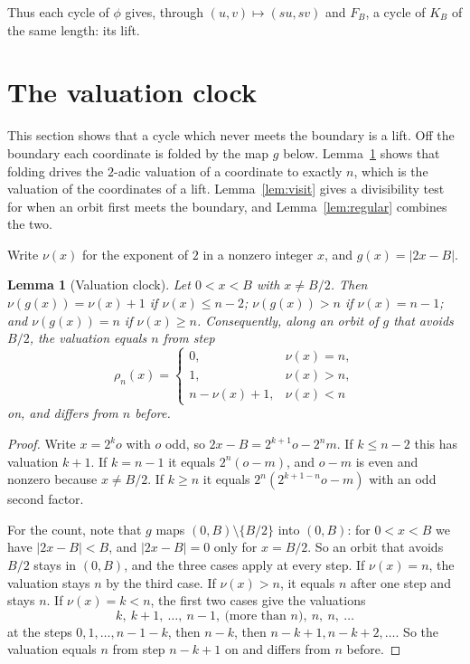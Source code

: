 \documentclass[11pt]{amsart}
\newtheorem{lemma}[theorem]{Lemma}
\theoremstyle{definition}
\theoremstyle{remark}
\newcommand{\vt}{\nu}
\begin{document}
Thus each cycle of $\phi$ gives, through $(u,v)\mapsto(su,sv)$ and $F_B$, a cycle of $K_B$ of the same length: its lift.

\section{The valuation clock}

This section shows that a cycle which never meets the boundary is a lift. Off the boundary each coordinate is folded by the map $g$ below. Lemma~\ref{lem:valuation} shows that folding drives the $2$-adic valuation of a coordinate to exactly $n$, which is the valuation of the coordinates of a lift. Lemma~\ref{lem:visit} gives a divisibility test for when an orbit first meets the boundary, and Lemma~\ref{lem:regular} combines the two.

Write $\vt(x)$ for the exponent of $2$ in a nonzero integer $x$, and $g(x)=|2x-B|$.

\begin{lemma}[Valuation clock]\label{lem:valuation}
Let $0<x<B$ with $x\ne B/2$. Then $\vt(g(x))=\vt(x)+1$ if $\vt(x)\le n-2$; $\vt(g(x))>n$ if $\vt(x)=n-1$; and $\vt(g(x))=n$ if $\vt(x)\ge n$. Consequently, along an orbit of $g$ that avoids $B/2$, the valuation equals $n$ from step
\[
\rho_n(x)=\begin{cases}0,&\vt(x)=n,\\ 1,&\vt(x)>n,\\ n-\vt(x)+1,&\vt(x)<n\end{cases}
\]
on, and differs from $n$ before.
\end{lemma}

\begin{proof}
Write $x=2^ko$ with $o$ odd, so $2x-B=2^{k+1}o-2^nm$. If $k\le n-2$ this has valuation $k+1$. If $k=n-1$ it equals $2^n(o-m)$, and $o-m$ is even and nonzero because $x\ne B/2$. If $k\ge n$ it equals $2^n(2^{k+1-n}o-m)$ with an odd second factor.

For the count, note that $g$ maps $(0,B)\setminus\{B/2\}$ into $(0,B)$: for $0<x<B$ we have $|2x-B|<B$, and $|2x-B|=0$ only for $x=B/2$. So an orbit that avoids $B/2$ stays in $(0,B)$, and the three cases apply at every step. If $\vt(x)=n$, the valuation stays $n$ by the third case. If $\vt(x)>n$, it equals $n$ after one step and stays $n$. If $\vt(x)=k<n$, the first two cases give the valuations
\[
k,\ k+1,\ \dots,\ n-1,\ \text{(more than $n$)},\ n,\ n,\ \dots
\]
at the steps $0,1,\dots,n-1-k$, then $n-k$, then $n-k+1,n-k+2,\dots$. So the valuation equals $n$ from step $n-k+1$ on and differs from $n$ before.
\end{proof}
\end{document}
